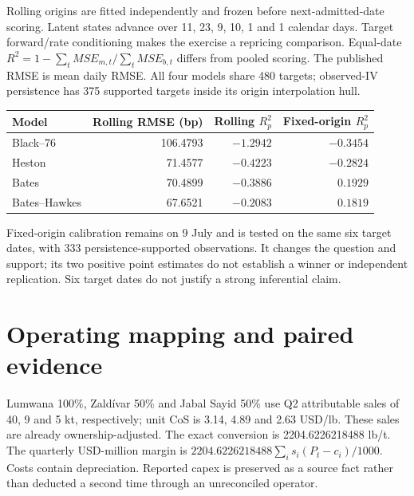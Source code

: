 \documentclass[10pt,a4paper]{article}
\begin{document}
Rolling origins are fitted independently and frozen before next-admitted-date scoring. Latent states advance over 11, 23, 9, 10, 1 and 1 calendar days. Target forward/rate conditioning makes the exercise a repricing comparison. Equal-date $R^2=1-\sum_t MSE_{m,t}/\sum_t MSE_{b,t}$ differs from pooled scoring. The published RMSE is mean daily RMSE. All four models share 480 targets; observed-IV persistence has 375 supported targets inside its origin interpolation hull.
\begin{center}\begin{tabular}{lrrr}\toprule
Model & Rolling RMSE (bp) & Rolling $R^2_p$ & Fixed-origin $R^2_p$ \\\midrule
Black--76 & 106.4793 & $-1.2942$ & $-0.3454$ \\
Heston & 71.4577 & $-0.4223$ & $-0.2824$ \\
Bates & 70.4899 & $-0.3886$ & $0.1929$ \\
Bates--Hawkes & 67.6521 & $-0.2083$ & $0.1819$ \\
\bottomrule\end{tabular}\end{center}
Fixed-origin calibration remains on 9 July and is tested on the same six target dates, with 333 persistence-supported observations. It changes the question and support; its two positive point estimates do not establish a winner or independent replication. Six target dates do not justify a strong inferential claim.

\section{Operating mapping and paired evidence}
Lumwana 100\%, Zald\'ivar 50\% and Jabal Sayid 50\% use Q2 attributable sales of 40, 9 and 5 kt, respectively; unit CoS is 3.14, 4.89 and 2.63 USD/lb. These sales are already ownership-adjusted. The exact conversion is 2204.6226218488 lb/t. The quarterly USD-million margin is $2204.6226218488\sum_i s_i(P_t-c_i)/1000$. Costs contain depreciation. Reported capex is preserved as a source fact rather than deducted a second time through an unreconciled operator.
\end{document}
